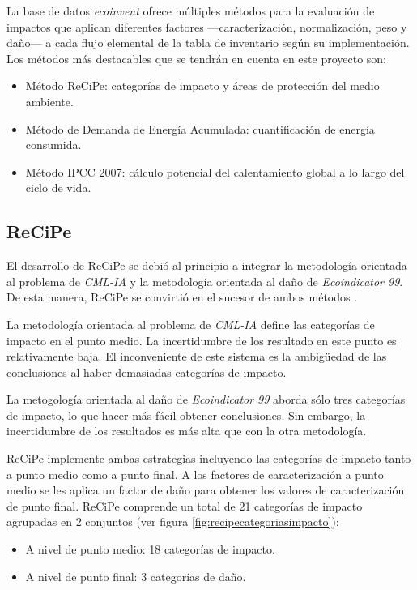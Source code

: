 La base de datos \textit{ecoinvent} ofrece múltiples métodos para la evaluación de impactos que aplican diferentes factores —caracterización, normalización, peso y daño— a cada flujo elemental de la tabla de inventario según su implementación. Los métodos más destacables que se tendrán en cuenta en este proyecto son:

\begin{itemize}
  \item Método ReCiPe: categorías de impacto y áreas de protección del medio ambiente.
  \item Método de Demanda de Energía Acumulada: cuantificación de energía consumida.
  \item Método IPCC 2007: cálculo potencial del calentamiento global a lo largo del ciclo de vida.
\end{itemize}

\subsection{ReCiPe}\label{sec:recipe}

El desarrollo de ReCiPe se debió al principio a integrar la metodología orientada al problema de \textit{CML-IA} y la metodología orientada al daño de \textit{Ecoindicator 99}. De esta manera, ReCiPe se convirtió en el sucesor de ambos métodos \cite{mgoedkoop3}.

La metodología orientada al problema de \textit{CML-IA} define las categorías de impacto en el punto medio. La incertidumbre de los resultado en este punto es relativamente baja. El inconveniente de este sistema es la ambigüedad de las conclusiones al haber demasiadas categorías de impacto.

La metogología orientada al daño de \textit{Ecoindicator 99} aborda sólo tres categorías de impacto, lo que hacer más fácil obtener conclusiones. Sin embargo, la incertidumbre de los resultados es más alta que con la otra metodología.

ReCiPe implemente ambas estrategias incluyendo las categorías de impacto tanto a punto medio como a punto final. A los factores de caracterización a punto medio se les aplica un factor de daño para obtener los valores de caracterización de punto final. ReCiPe comprende un total de 21 categorías de impacto agrupadas en 2 conjuntos (ver figura \ref{fig:recipecategoriasimpacto}):
\begin{itemize}
\item A nivel de punto medio: 18 categorías de impacto.
\item A nivel de punto final: 3 categorías de daño.
\end{itemize}

